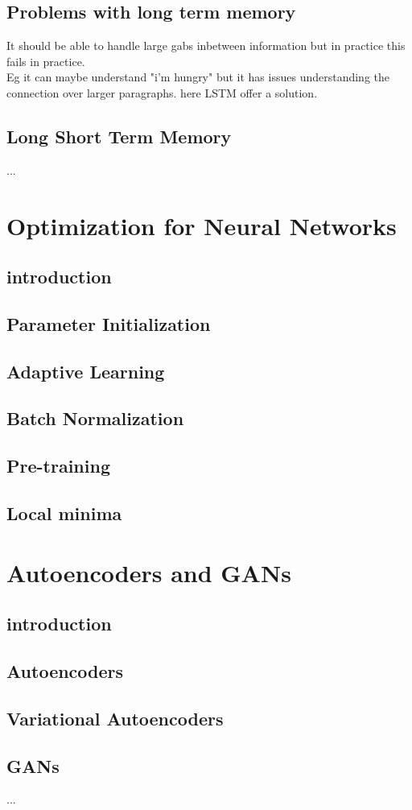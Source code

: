 \documentclass[a4paper,10pt,titlepage]{report}
\begin{document}
\subsection{Problems with long term memory}
It should be able to handle large gabs inbetween information but in practice this fails in practice.\\
Eg it can maybe understand "i'm hungry" but it has issues understanding the connection over larger paragraphs. here LSTM offer a solution.
\subsection{Long Short Term Memory}
...

\newpage
\section{Optimization for Neural Networks}
\subsection{introduction}
\subsection{Parameter Initialization}
\subsection{Adaptive Learning}
\subsection{Batch Normalization}
\subsection{Pre-training}
\subsection{Local minima}

\newpage
\section{Autoencoders and GANs}
\subsection{introduction}
\subsection{Autoencoders}
\subsection{Variational Autoencoders}
\subsection{GANs}
...
\end{document}
